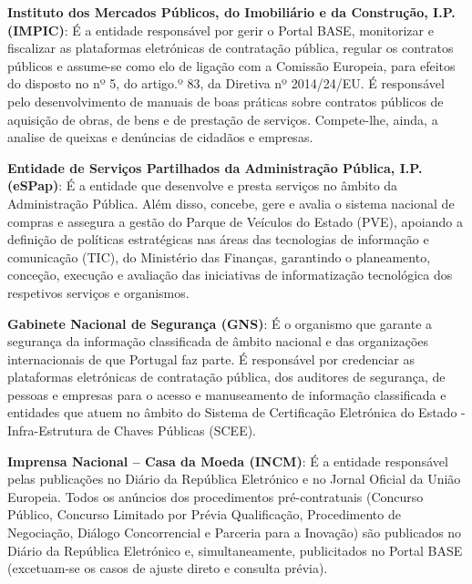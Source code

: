 \begin{my_enumerate}
	\item  \textbf{Instituto dos Mercados Públicos, do Imobiliário e da Construção, I.P. (IMPIC)}: É a entidade responsável por gerir o Portal BASE, monitorizar e fiscalizar as plataformas eletrónicas de contratação pública, regular os contratos públicos e assume-se como elo de ligação com a Comissão Europeia, para efeitos do disposto no nº 5, do artigo.º 83, da Diretiva nº 2014/24/EU. É responsável pelo desenvolvimento de manuais de boas práticas sobre contratos públicos de aquisição de obras, de bens e de prestação de serviços. Compete-lhe, ainda, a analise de queixas e denúncias de cidadãos e empresas.
	
	\item \textbf{Entidade de Serviços Partilhados da Administração Pública, I.P. (eSPap)}: É a entidade que desenvolve e presta serviços no âmbito da Administração Pública. Além disso, concebe, gere e avalia o sistema nacional de compras e assegura a gestão do Parque de Veículos do Estado (PVE), apoiando a definição de políticas estratégicas nas áreas das tecnologias de informação e comunicação (TIC), do Ministério das Finanças, garantindo o planeamento, conceção, execução e avaliação das iniciativas de informatização tecnológica dos respetivos serviços e organismos.
	
	\item \textbf{Gabinete Nacional de Segurança (GNS)}: É o organismo que garante a segurança da informação classificada de âmbito nacional e das organizações internacionais de que Portugal faz parte. É responsável por credenciar as plataformas eletrónicas de contratação pública, dos auditores de segurança, de pessoas e empresas para o acesso e manuseamento de informação classificada e entidades que atuem no âmbito do Sistema de Certificação Eletrónica do Estado - Infra-Estrutura de Chaves Públicas (SCEE).
	
	\item \textbf{Imprensa Nacional – Casa da Moeda (INCM)}: É a entidade responsável pelas publicações no Diário da República Eletrónico e no Jornal Oficial da União Europeia. Todos os anúncios dos procedimentos pré-contratuais (Concurso Público, Concurso Limitado por Prévia Qualificação, Procedimento de Negociação, Diálogo Concorrencial e Parceria para a Inovação) são publicados no Diário da República Eletrónico e, simultaneamente, publicitados no Portal BASE (excetuam-se os casos de ajuste direto e consulta prévia).
	

\end{my_enumerate}
